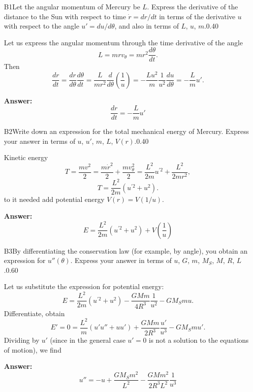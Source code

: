 \documentclass[11pt,a4paper]{article}
\begin{document}
\begin{solcard}{B1}{Let the angular momentum of Mercury be $L$. Express the derivative of the distance to the Sun with respect to time $\dot{r} = dr/dt$ in terms of the derivative $u$ with respect to the angle $u' = du/d\theta$, and also in terms of $L$, $u$, $m$.}{0.40}

Let us express the angular momentum through the time derivative of the angle $$ L = m r v_\theta = m r^2 \frac{d\theta}{dt}. $$Then $$ \frac{dr}{dt} = \frac{d r}{d \theta} \frac{d \theta}{dt} = \frac{L}{m r^2} \frac{d}{d\theta} \left( \frac{1}{u}\right) = - \frac{L u^2}{m} \frac{1}{u^2} \frac{du}{d\theta} = - \frac{L}{m} u'. $$

\par\smallskip\noindent\textbf{Answer:} $$ \frac{dr}{dt} = - \frac{L}{m} u' $$
\end{solcard}

\begin{solcard}{B2}{Write down an expression for the total mechanical energy of Mercury. Express your answer in terms of $u$, $u'$, $m$, $L$, $V(r)$.}{0.40}

Kinetic energy $$ T = \frac{m v^2}{2} = \frac{m \dot{r}^2}{2 } + \frac{m v_\theta^2}{2} = \frac{L^2}{2 m} u^{\prime 2} + \frac{L^2}{2 m r^2}, $$$$ T = \frac{L^2}{2 m} (u^{\prime 2} + u^2). $$to it needed add potential energy $V(r) = V(1/u)$.

\par\smallskip\noindent\textbf{Answer:} $$ E =  \frac{L^2}{2 m} (u^{\prime 2} + u^2) + V \left( \frac{1}{u}\right) $$
\end{solcard}

\begin{solcard}{B3}{By differentiating the conservation law (for example, by angle), you obtain an expression for $u''(\theta)$. Express your answer in terms of $u$, $G$, $m$, $M_S$, $M$, $R$, $L$.}{0.60}

Let us substitute the expression for potential energy: $$ E = \frac{L^2}{2 m} (u^{\prime 2} + u^2) - \frac{GM m}{4 R^3}\frac{1}{u^2} - GM_S m u. $$Differentiate, obtain $$ E' = 0 = \frac{L^2}{m} (u' u'' + u u') + \frac{G M m}{2 R^3} \frac{u'}{u^3} - G M_S m u'. $$Dividing by $u'$ (since in the general case $u' = 0$ is not a solution to the equations of motion), we find

\par\smallskip\noindent\textbf{Answer:} $$ u'' = - u + \frac{G M_S m^2 }{L^2} - \frac{GM m^2}{2 R^3 L^2} \frac{1}{u^3} $$
\end{solcard}
\end{document}
